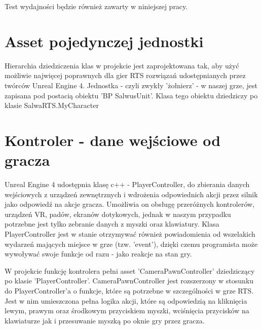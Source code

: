 \documentclass[12pt]{report}
\begin{document}
Test wydajności będzie również zawarty w niniejszej pracy.

\section{Asset pojedynczej jednostki}


Hierarchia dziedziczenia klas w projekcie jest zaprojektowana tak, aby użyć możliwie najwięcej poprawnych dla gier RTS rozwiązań udostępnianych przez twórców Unreal Engine 4. Jednostka - czyli zwykły 'żołnierz' - w naszej grze, jest zapisana pod postacią obiektu 'BP SalwusUnit'. Klasa tego obiektu dziedziczy po klasie SalwaRTS.MyCharacter















\section{Kontroler - dane wejściowe od gracza}
Unreal Engine 4 udostępnia klasę c++ - PlayerController, do zbierania danych wejściowych z urządzeń zewnętrznych i wdrożenia odpowiednich akcji przez silnik jako odpowiedź na akcje gracza. Umożliwia on obsługę przeróżnych kontrolerów, urządzeń VR, padów, ekranów dotykowych, jednak w naszym przypadku potrzebne jest tylko zebranie danych z myszki oraz klawiatury. Klasa PlayerController jest w stanie otrzymywać również powiadomienia od wszelakich wydarzeń mających miejsce w grze (tzw. 'event'), dzięki czemu programista może wywoływać swoje funkcje od razu - jako reakcje na stan gry.

W projekcie funkcję kontrolera pełni asset 'CameraPawnController' dziedziczący po klasie 'PlayerController'. CameraPawnController jest rozszerzony w stosunku do PlayerController'a o funkcje, które są potrzebne w szczególności w grze RTS. Jest w nim umieszczona pełna logika akcji, które są odpowiedzią na kliknięcia lewym, prawym oraz środkowym przyciskiem myszki, wciśnięcia przycisków na klawiaturze jak i przesuwanie myszką po oknie gry przez gracza.
\end{document}
